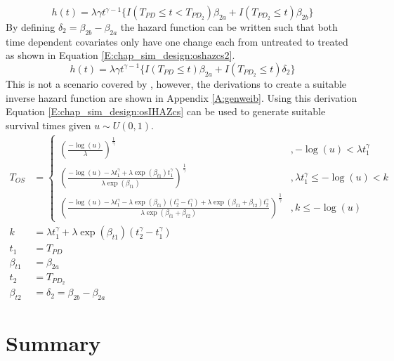 \begin{equation}
\label{E:chap_sim_design:oshazcs}
h(t)  = \lambda \gamma t^{\gamma-1} \{ I(T_{PD} \leq t < T_{PD_2}) \beta_{2a} + I(T_{PD_2} \leq t) \beta_{2b} \}
\end{equation}
By defining $\delta_2 = \beta_{2b}-\beta_{2a}$ the hazard function can be written such that both time dependent covariates only have one change each from untreated to treated as shown in Equation \ref{E:chap_sim_design:oshazcs2}.
\begin{equation}
\label{E:chap_sim_design:oshazcs2}
h(t)  = \lambda \gamma t^{\gamma-1} \{ I(T_{PD} \leq t) \beta_{2a} + I(T_{PD_2} \leq t) \delta_2 \}
\end{equation}
 This is not a scenario covered by \cite{Austin2012}, however, the derivations to create a suitable inverse hazard function are shown in Appendix \ref{A:genweib}. Using this derivation Equation \ref{E:chap_sim_design:osIHAZcs} can be used to generate suitable survival times given $u \sim U(0,1)$.
\begin{align}
\label{E:chap_sim_design:osIHAZcs}
T_{OS} & = \begin{cases} 
 \left( \frac{-\log(u)}{\lambda } \right)^{\frac{1}{ \gamma}}
 & , -\log(u) < \lambda  t_1^\gamma\\ 
  \left( \frac{-\log(u) - \lambda t_1^{\gamma} + \lambda \exp(\beta_{t1}) t_1^{\gamma} }{\lambda \exp(\beta_{t1})} \right) ^\frac{1}{\gamma} 
 &  ,\lambda  t_1^\gamma \leq -\log(u) < k \\
  \left( \frac{-\log(u) - \lambda t_{1}^{\gamma} - \lambda \exp(\beta_{t1}) ( t_{2}^{\gamma} - t_{1}^{\gamma}) +  \lambda \exp(\beta_{t1}+\beta_{t2}) t_{2}^{\gamma} } 
 {\lambda \exp( \beta_{t1}+\beta_{t2})}  \right)^{\frac{1}{\gamma}} 
 &  , k \leq -\log(u) 
\end{cases} \nonumber \\
 k &=  \lambda  t_1^\gamma + \lambda \exp(\beta_{t1})(t_2^\gamma - t_1^\gamma) \\
 t_1 & =  T_{PD}\nonumber \\
 \beta_{t1} &= \beta_{2a} \nonumber \\
 t_2 & =  T_{PD_2} \nonumber \\ 
 \beta_{t2} &= \delta_2 =  \beta_{2b}-\beta_{2a} \nonumber 
\end{align}

\section{Summary}

